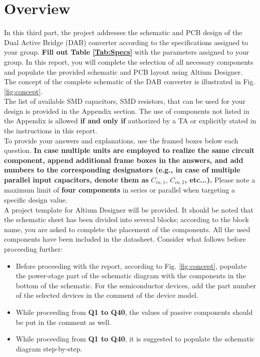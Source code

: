 \documentclass{PELsmallreport}
\begin{document}
\maketitle

\tableofcontents
\vfill




\clearpage
\section{Overview}
In this third part, the project addresses the schematic and PCB design of the Dual Active Bridge (DAB) converter according to the specifications assigned to your group. \textbf{Fill out Table \ref{Tab:Specs}} with the parameters assigned to your group. In this report, you will complete the selection of all necessary components and populate the provided schematic and PCB layout using Altium Designer. The concept of the complete schematic of the DAB converter is illustrated in Fig. \ref{fig:concept}. \\

The list of available SMD capacitors, SMD resistors, that can be used for your design is provided in the Appendix section. The use of components not listed in the Appendix is allowed \textbf{if and only if} authorized by a TA or explicitly stated in the instructions in this report.\\

To provide your answers and explanations, use the framed boxes below each question. \textbf{In case multiple units are employed to realize the same circuit component, append additional frame boxes in the answers, and add numbers to the corresponding designators (e.g., in case of multiple parallel input capacitors, denote them as }$C_{in,1}$, $C_{in,2}$\textbf{, etc...).} Please note a maximum limit of \textbf{four components} in series or parallel when targeting a specific design value.\\

A project template for Altium Designer will be provided. It should be noted that the schematic sheet has been divided into several blocks; according to the block name, you are asked to complete the placement of the components. All the used components have been included in the datasheet.
Consider what follows before proceeding further: 
\begin{itemize}
    \item Before proceeding with the report, according to Fig. \ref{fig:concept}, populate the power-stage part of the schematic diagram with the components in the bottom of the schematic. 
    For the semiconductor devices, add the part number of the selected devices in the comment of the device model. 
    \item While proceeding from \textbf{Q1 to Q40}, the values of passive components should be put in the comment as well.
    \item While proceeding from \textbf{Q1 to Q40}, it is suggested to populate the schematic diagram step-by-step.\\
\end{itemize}
\end{document}
